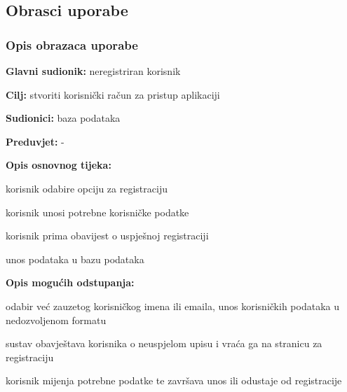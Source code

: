			\eject 
			
			
				
			\subsection{Obrasci uporabe}
				
				
				\subsubsection{Opis obrazaca uporabe}
					
					\noindent {}
					\begin{packed_item}
	
						\item \textbf{Glavni sudionik: } neregistriran korisnik
						\item  \textbf{Cilj:} stvoriti korisnički račun za pristup aplikaciji
						\item  \textbf{Sudionici:} baza podataka
						\item  \textbf{Preduvjet:} -
						\item  \textbf{Opis osnovnog tijeka:}
						
						\item[] \begin{packed_enum}
	
							\item korisnik odabire opciju za registraciju
							\item korisnik unosi potrebne korisničke podatke
							\item korisnik prima obavijest o uspješnoj registraciji
							\item unos podataka u bazu podataka
						\end{packed_enum}
						
						\item  \textbf{Opis mogućih odstupanja:}
						
						\item[] \begin{packed_item}
	
							\item[2.a] odabir već zauzetog korisničkog imena ili emaila, unos korisničkih podataka u nedozvoljenom formatu
							\item[] \begin{packed_enum}
								\item sustav obavještava korisnika o neuspjelom upisu i vraća ga na stranicu za registraciju
								\item korisnik mijenja potrebne podatke te završava unos ili odustaje od registracije
							\end{packed_enum}
							
						\end{packed_item}
					\end{packed_item}
					

